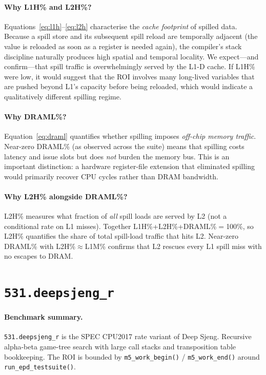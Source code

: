 \documentclass[11pt,a4paper]{article}
\begin{document}
\paragraph{Why L1H\% and L2H\%?}
Equations~\eqref{eq:l1h}--\eqref{eq:l2h} characterise the
\emph{cache footprint} of spilled data.  Because a spill store and
its subsequent spill reload are temporally adjacent (the value is
reloaded as soon as a register is needed again), the compiler's stack
discipline naturally produces high spatial and temporal locality.
We expect---and confirm---that spill traffic is overwhelmingly served
by the L1-D cache.  If L1H\% were low, it would suggest that the
ROI involves many long-lived variables that are pushed beyond L1's
capacity before being reloaded, which would indicate a qualitatively
different spilling regime.

\paragraph{Why DRAML\%?}
Equation~\eqref{eq:draml} quantifies whether spilling imposes
\emph{off-chip memory traffic}.  Near-zero DRAML\% (as observed
across the suite) means that spilling costs latency and issue slots
but does \emph{not} burden the memory bus.  This is an important
distinction: a hardware register-file extension that eliminated
spilling would primarily recover CPU cycles rather than DRAM bandwidth.

\paragraph{Why L2H\% alongside DRAML\%?}
L2H\% measures what fraction of \emph{all} spill loads are served by
L2 (not a conditional rate on L1 misses).  Together L1H\%+L2H\%+DRAML\%$=$100\%,
so L2H\% quantifies the share of total spill-load traffic that hits L2.
Near-zero DRAML\% with L2H\%$\approx$L1M\% confirms that L2 rescues
every L1 spill miss with no escapes to DRAM.

\clearpage


\section{\texttt{531.deepsjeng\_r}}
\label{sec:deepsjeng}

\paragraph{Benchmark summary.}
\texttt{531.deepsjeng\_r} is the SPEC CPU2017 rate variant of Deep Sjeng.
Recursive alpha-beta game-tree search with large call stacks and transposition table bookkeeping.
The ROI is bounded by \texttt{m5\_work\_begin()} / \texttt{m5\_work\_end()}
around \texttt{run\_epd\_testsuite()}.
\end{document}
